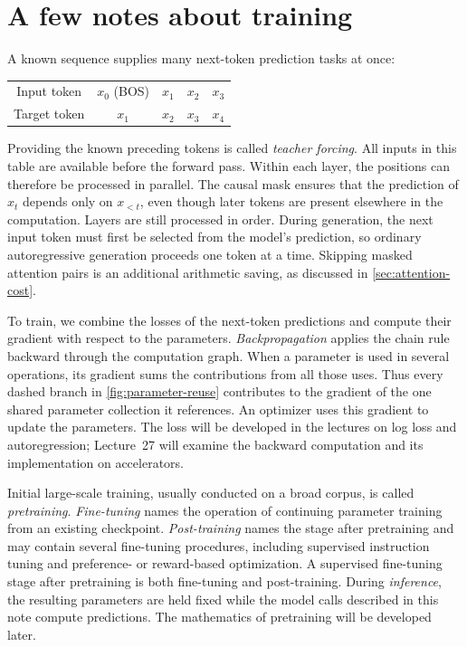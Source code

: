 \documentclass[11pt,twoside]{article}
\theoremstyle{plain}
\theoremstyle{definition}
\theoremstyle{remark}
\begin{document}
\section{A few notes about training}

A known sequence supplies many next-token prediction tasks at once:
\begin{center}
\begin{tabular}{c|cccc}
Input token & $x_0$ (BOS) & $x_1$ & $x_2$ & $x_3$\\
Target token & $x_1$ & $x_2$ & $x_3$ & $x_4$
\end{tabular}
\end{center}
Providing the known preceding tokens is called \emph{teacher forcing}.
All inputs in this table are available before the forward pass. Within each
layer, the positions can therefore be processed in parallel. The causal mask
ensures that the prediction of $x_t$ depends only on $x_{<t}$, even though later
tokens are present elsewhere in the computation. Layers are still processed
in order. During generation, the next input token must first be selected from
the model's prediction, so ordinary autoregressive generation proceeds one
token at a time. Skipping masked attention pairs is an additional arithmetic
saving, as discussed in \cref{sec:attention-cost}.

To train, we combine the losses of the next-token predictions and compute
their gradient with respect to the parameters. \emph{Backpropagation} applies
the chain rule backward through the computation graph. When a parameter is
used in several operations, its gradient sums the contributions from all those
uses. Thus every dashed branch in \cref{fig:parameter-reuse} contributes to the
gradient of the one shared parameter collection it references. An optimizer
uses this gradient to update the parameters. The loss will be developed in
the lectures on log loss and autoregression; Lecture~27 will examine the
backward computation and its implementation on accelerators.

Initial large-scale training, usually conducted on a broad corpus, is called
\emph{pretraining}.
\emph{Fine-tuning} names the operation of continuing parameter training from
an existing checkpoint. \emph{Post-training} names the stage after
pretraining and may contain several fine-tuning procedures, including
supervised instruction tuning and preference- or reward-based optimization.
A supervised fine-tuning stage after pretraining is both fine-tuning and
post-training. During \emph{inference}, the resulting parameters are held
fixed while the model calls described in this note compute predictions.
The mathematics of pretraining will be developed later.
\end{document}
